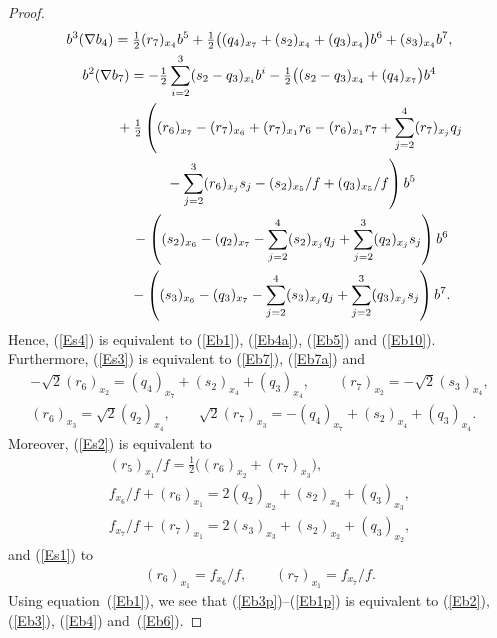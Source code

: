\documentclass[11pt]{article}
\numberwithin{equation}{section}
\begin{document}
\begin{proof}
\begin{gather*}
b^3(\nabla b_4) = \tfrac12 (r_7)_{x_4} b^5+\tfrac12\big((q_4)_{x_7}+(s_2)_{x_4}+(q_3)_{x_4}\big) b^6+(s_3)_{x_4} b^7 , \label{En7}\\
b^2(\nabla b_7) = -\tfrac12 \sum_{i=2}^3(s_2-q_3)_{x_i} b^i -\tfrac12 \big((s_2-q_3)_{x_4}+(q_4)_{x_7}\big) b^4 \nonumber \\
\hphantom{b^2(\nabla b_7) =}{} +\tfrac12 \left( (r_6)_{x_7}-(r_7)_{x_6} +(r_7)_{x_1}r_6-(r_6)_{x_1}r_7+\sum_{j=2}^4 (r_7)_{x_j}q_j \right. \nonumber\\
 \left. \hphantom{b^2(\nabla b_7) =}{} -\sum_{j=2}^3 (r_6)_{x_j}s_j -(s_2)_{x_5}/f+(q_3)_{x_5}/f\right) b^5 \label{En8} \\
\hphantom{b^2(\nabla b_7) =}{} -\left((s_2)_{x_6}-(q_2)_{x_7}-\sum_{j=2}^4(s_2)_{x_j}q_j+\sum_{j=2}^3(q_2)_{x_j}s_j\right) b^6 \nonumber\\
\hphantom{b^2(\nabla b_7) =}{} -\left( (s_3)_{x_6}-(q_3)_{x_7}-\sum_{j=2}^4(s_3)_{x_j}q_j+\sum_{j=2}^3(q_3)_{x_j}s_j \right) b^7 .\nonumber
\end{gather*}
Hence, (\ref{Es4}) is equivalent to (\ref{Eb1}), (\ref{Eb4a}), (\ref{Eb5}) and (\ref{Eb10}). Furthermore, (\ref{Es3}) is equivalent to (\ref{Eb7}), (\ref{Eb7a}) and
\begin{gather}
 -\sqrt{2} (r_6)_{x_2}= (q_4)_{x_7}+(s_2)_{x_4}+(q_3)_{x_4},\qquad (r_7)_{x_2}=-\sqrt{2} (s_3)_{x_4},\label{Eb3p}\\
 (r_6)_{x_3}=\sqrt{2} (q_2)_{x_4},\qquad \sqrt{2}(r_7)_{x_3}= -(q_4)_{x_7}+(s_2)_{x_4}+(q_3)_{x_4}.\label{Eb4p}
\end{gather}
Moreover, (\ref{Es2}) is equivalent to
\begin{gather}
(r_5)_{x_1}/f = \tfrac12 \big( (r_6)_{x_2}+(r_7)_{x_3}\big),\label{Ebeg}\\
f_{x_6}/f+(r_6)_{x_1}=2(q_2)_{x_2}+(s_2)_{x_3}+(q_3)_{x_3},\\
f_{x_7}/f+(r_7)_{x_1}=2(s_3)_{x_3}+(s_2)_{x_2}+(q_3)_{x_2},\label{Eend}
\end{gather}
and (\ref{Es1}) to
\begin{gather}\label{Eb1p}
(r_6)_{x_1}=f_{x_6}/f, \qquad (r_7)_{x_1}=f_{x_7}/f.
\end{gather}
Using equation~(\ref{Eb1}), we see that (\ref{Eb3p})--(\ref{Eb1p}) is equivalent to (\ref{Eb2}), (\ref{Eb3}), (\ref{Eb4}) \linebreak and~(\ref{Eb6}).
 \end{proof}
\end{document}
